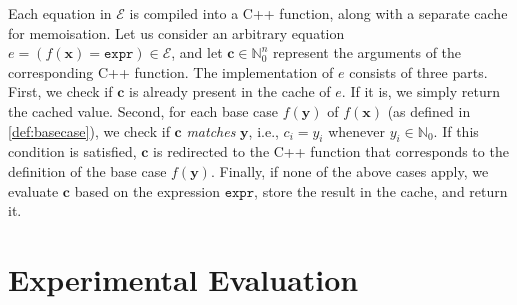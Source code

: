 \documentclass[letterpaper]{article} %
\theoremstyle{remark}
\theoremstyle{definition}
\newcommand{\expr}{\mathtt{expr}}
\newcommand{\FO}{$\mathsf{FO}$}
\newcommand{\UFO}{$\mathsf{UFO}^{2} + \mathsf{CC}$}
\begin{document}
Each equation in $\mathcal{E}$ is compiled into a C++ function, along with a
separate cache for memoisation. Let us consider an arbitrary equation
$e = (f(\mathbf{x}) = \expr{}) \in \mathcal{E}$, and let
$\mathbf{c} \in \mathbb{N}_{0}^{n}$ represent the arguments of the corresponding
C++ function. The implementation of $e$ consists of three parts. First, we check
if $\mathbf{c}$ is already present in the cache of $e$. If it is, we simply
return the cached value. Second, for each base case $f(\mathbf{y})$ of
$f(\mathbf{x})$ (as defined in \cref{def:basecase}), we check if $\mathbf{c}$
\emph{matches} $\mathbf{y}$, i.e., $c_{i} = y_{i}$ whenever
$y_{i} \in \mathbb{N}_{0}$. If this condition is satisfied, $\mathbf{c}$ is
redirected to the C++ function that corresponds to the definition of the base
case $f(\mathbf{y})$. Finally, if none of the above cases apply, we evaluate
$\mathbf{c}$ based on the expression $\expr{}$, store the result in the cache,
and return it.

\section{Experimental Evaluation}\label{sec:experiments}





\end{document}
